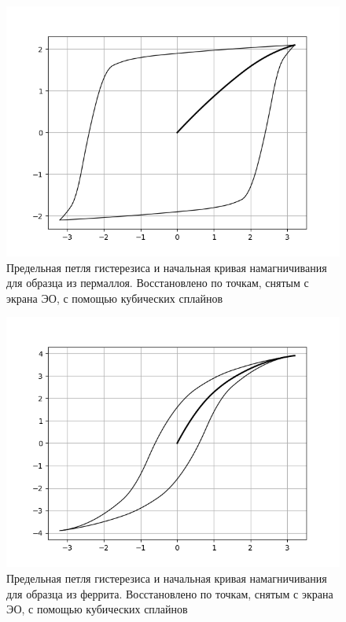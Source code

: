 \documentclass[a4paper,10pt]{article}
\begin{document}
\begin{figure}[h]
	\centering
	\includegraphics[scale=0.75]{Loop_1}
	\caption{Предельная петля гистерезиса и начальная кривая намагничивания для образца из пермаллоя. Восстановлено по точкам, снятым с экрана ЭО, с помощью кубических сплайнов} \label{Loop_1}
\end{figure}

\begin{figure}[h]
	\centering
	\includegraphics[scale=0.75]{Loop_2}
	\caption{Предельная петля гистерезиса и начальная кривая намагничивания для образца из феррита. Восстановлено по точкам, снятым с экрана ЭО, с помощью кубических сплайнов} \label{Loop_2}
\end{figure}
\end{document}
